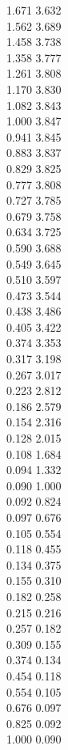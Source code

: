 \documentclass{article}
\begin{document}
{  1.671 3.632 \\ 1.562 3.689 \\ 1.458 3.738 \\ 1.358 3.777 \\ 1.261 3.808 \\ 1.170 3.830 \\ 1.082 3.843 \\ 1.000 3.847 \\
  0.941 3.845 \\ 0.883 3.837 \\ 0.829 3.825 \\ 0.777 3.808 \\ 0.727 3.785 \\ 0.679 3.758 \\ 0.634 3.725 \\ 0.590 3.688 \\
  0.549 3.645 \\ 0.510 3.597 \\ 0.473 3.544 \\ 0.438 3.486 \\ 0.405 3.422 \\ 0.374 3.353 \\ 0.317 3.198 \\ 0.267 3.017 \\
  0.223 2.812 \\ 0.186 2.579 \\ 0.154 2.316 \\ 0.128 2.015 \\ 0.108 1.684 \\ 0.094 1.332 \\ 0.090 1.000 \\ 0.092 0.824 \\
  0.097 0.676 \\ 0.105 0.554 \\ 0.118 0.455 \\ 0.134 0.375 \\ 0.155 0.310 \\ 0.182 0.258 \\ 0.215 0.216 \\ 0.257 0.182 \\
  0.309 0.155 \\ 0.374 0.134 \\ 0.454 0.118 \\ 0.554 0.105 \\ 0.676 0.097 \\ 0.825 0.092 \\ 1.000 0.090 \\
}\curvaxyeC%
\end{document}
